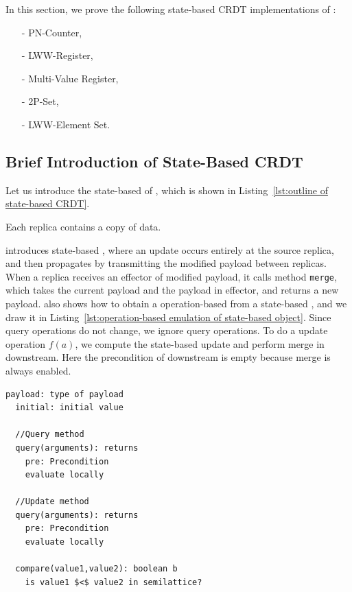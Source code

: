 In this section, we prove the following state-based CRDT implementations of \cite{ShapiroPBZ11}:

\begin{itemize}
\setlength{\itemsep}{0.5pt}
\item[-] PN-Counter,

\item[-] LWW-Register,

\item[-] Multi-Value Register,

\item[-] 2P-Set,

\item[-] LWW-Element Set.
\end{itemize}




\subsection{Brief Introduction of State-Based CRDT}
\label{subsec:brief introduction of state-baed CRDT} 

Let us introduce the state-based \crdtimp{} of \cite{ShapiroPBZ11}, which is shown in Listing~\ref{lst:outline of state-based CRDT}. 

Each replica contains a copy of data.  

\cite{ShapiroPBZ11} introduces state-based \crdtimp{}, where an update occurs entirely at the source replica, and then propagates by transmitting the modified payload between replicas. When a replica receives an effector of modified payload, it calls method {\tt merge}, which takes the current payload and the payload in effector, and returns a new payload. \cite{ShapiroPBZ11} also shows how to obtain a operation-based \crdtimp{} from a state-based \crdtimp{}, and we draw it in Listing~\ref{lst:operation-based emulation of state-based object}. Since query operations do not change, we ignore query operations. To do a update operation $f(a)$, we compute the state-based update and perform merge in downstream. Here the precondition of downstream is empty because merge is always enabled.


\begin{minipage}[t]{1.0\linewidth}
\begin{lstlisting}[frame=top,caption={Outline of state-based CRDT},
captionpos=b,label={lst:outline of state-based CRDT}]
  payload: type of payload 
  initial: initial value

  //Query method
  query(arguments): returns
    pre: Precondition 
    evaluate locally 
    
  //Update method
  query(arguments): returns
    pre: Precondition
    evaluate locally 
    
  compare(value1,value2): boolean b 
    is value1 $<$ value2 in semilattice? 
  
  
\end{lstlisting}
\end{minipage}



